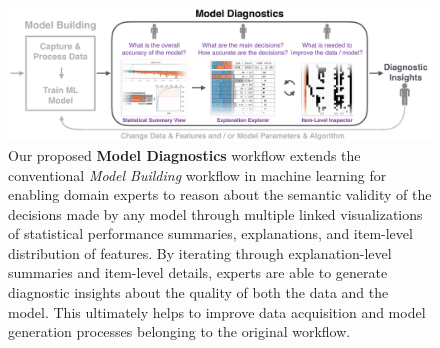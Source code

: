 \begin{figure}[t]
\centering
\includegraphics[width=\textwidth]{explainer/workflow5}
\caption[The Model Diagnostics workflow.]{
Our proposed \textbf{Model Diagnostics} workflow extends the conventional \textit{Model Building} workflow in machine learning for enabling domain experts to reason about the semantic validity of the decisions made by any model through multiple linked visualizations of statistical performance summaries, explanations, and item-level distribution of features. By iterating through explanation-level summaries and item-level details, experts are able to generate diagnostic insights about the quality of both the data and the model. This ultimately helps to improve data acquisition and model generation processes belonging to the original workflow.
}
\label{figs:workflow}
\end{figure}

